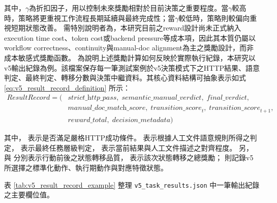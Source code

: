 \begin{ZhChapter}
\text 其中，$\gamma$為折扣因子，用以控制未來獎勵相對於目前決策之重要程度。當$\gamma$較高時，策略將更重視工作流程長期延續與最終完成性；當$\gamma$較低時，策略則較偏向重視短期狀態改善。
\text 需特別說明者為，本研究目前之reward設計尚未正式納入execution time cost、token cost或backend pressure等成本項，因此其本質仍屬以workflow correctness、continuity與manual-doc alignment為主之獎勵設計，而非成本敏感式獎勵函數。
\text 為說明上述獎勵計算如何反映於實際執行紀錄，本研究以v5輸出紀錄為例。該檔案保存每一筆測試案例於v5決策模式下之HTTP結果、語意判定、最終判定、轉移分數與決策中繼資料。其核心資料結構可抽象表示如式 \eqref{eq:v5_result_record_definition} 所示：
\begin{equation}
\label{eq:v5_result_record_definition}
\begin{aligned}
ResultRecord = (&\textit{strict\_http\_pass},\;
\textit{semantic\_manual\_verdict},\;
\textit{final\_verdict},\\
&\textit{manual\_doc\_match\_score},\;
\textit{transition\_score}_{t},\;
\textit{transition\_score}_{t+1},\\
&\textit{reward\_total},\;
\textit{decision\_metadata})
\end{aligned}
\end{equation}

\text 其中， 表示是否滿足嚴格HTTP成功條件。 表示根據人工文件語意規則所得之判定， 表示最終任務層級判定， 表示當前結果與人工文件描述之對齊程度。
\text 另， 與  分別表示行動前後之狀態轉移品質， 表示該次狀態轉移之總獎勵； 則記錄v5所選擇之標準化動作、執行期動作與對應特徵狀態。

\text 表 \ref{tab:v5_result_record_example} 整理 \texttt{v5\_task\_results.json} 中一筆輸出紀錄之主要欄位值。


\end{ZhChapter}
